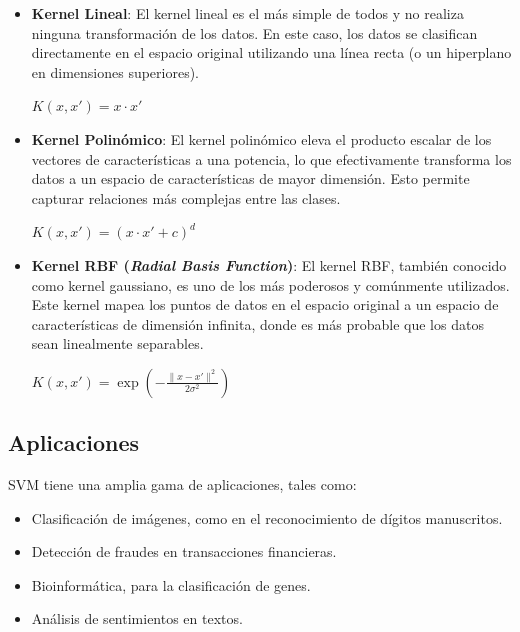 \documentclass[a4paper,12pt]{article}
\begin{document}
\begin{itemize}
   \item \textbf{Kernel Lineal}: El kernel lineal es el más simple de todos y no realiza ninguna transformación de los datos. En este caso, los datos se clasifican directamente en el espacio original utilizando una línea recta (o un hiperplano en dimensiones superiores).
   
  \begin{center}
    \large{$K(x, x') = x \cdot x'$}
  \end{center}

  \item \textbf{Kernel Polinómico}: El kernel polinómico eleva el producto escalar de los vectores de características a una potencia, lo que efectivamente transforma los datos a un espacio de características de mayor dimensión. Esto permite capturar relaciones más complejas entre las clases.
  
  \begin{center}
    \large{$K(x, x') = (x \cdot x' + c)^d$}
  \end{center}
  
  \item \textbf{Kernel RBF (\textit{Radial Basis Function})}: El kernel RBF, también conocido como kernel gaussiano, es uno de los más poderosos y comúnmente utilizados. Este kernel mapea los puntos de datos en el espacio original a un espacio de características de dimensión infinita, donde es más probable que los datos sean linealmente separables.
  
  \begin{center}
    \large{$K(x, x') = \exp\left(-\frac{\|x - x'\|^2}{2\sigma^2}\right)$}
  \end{center}
  
\end{itemize}

\pagebreak

\subsection{Aplicaciones}

SVM tiene una amplia gama de aplicaciones, tales como:
\begin{itemize}
    \item Clasificación de imágenes, como en el reconocimiento de dígitos manuscritos.
    \item Detección de fraudes en transacciones financieras.
    \item Bioinformática, para la clasificación de genes.
    \item Análisis de sentimientos en textos.
\end{itemize}
\end{document}
